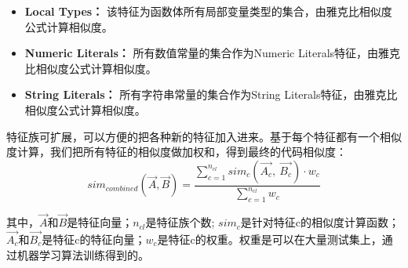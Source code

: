 \begin{itemize}
	
	\item \textbf{Local Types：} 该特征为函数体所有局部变量类型的集合，由雅克比相似度公式计算相似度。
	\item \textbf{Numeric Literals：} 所有数值常量的集合作为Numeric Literals特征，由雅克比相似度公式计算相似度。
	\item \textbf{String Literals：} 所有字符串常量的集合作为String Literals特征，由雅克比相似度公式计算相似度。
\end{itemize}

特征族可扩展，可以方便的把各种新的特征加入进来。基于每个特征都有一个相似度计算，我们把所有特征的相似度做加权和，得到最终的代码相似度：
\begin{equation}
	sim_{combined}(\vec{A},\vec{B})=\frac{\sum_{c=1}^{n_{cl}}sim_{c}(\vec{A_c},~\vec{B_c})\cdot w_{c}}{\sum_{c=1}^{n_{cl}}w_{c}}
\end{equation}

其中，$\vec{A}$和$\vec{B}$是特征向量；$n_{cl}$是特征族个数; $sim_{c}$是针对特征c的相似度计算函数；$\vec{A_c}$和$\vec{B_c}$是特征c的特征向量；$w_{c}$是特征c的权重。权重是可以在大量测试集上，通过机器学习算法训练得到的。